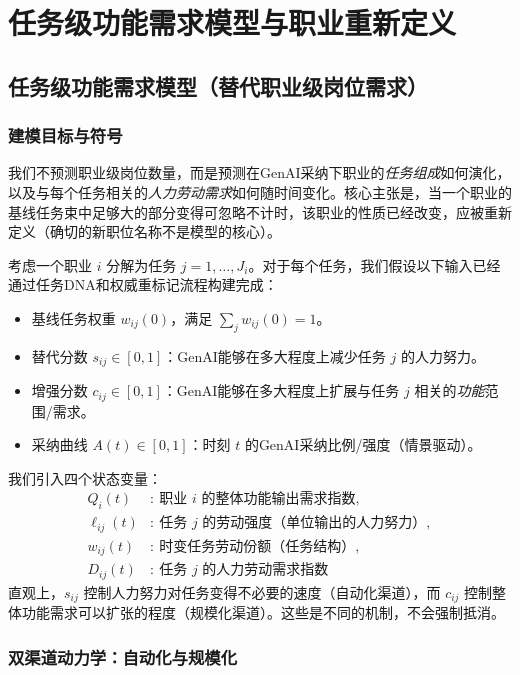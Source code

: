 \section{任务级功能需求模型与职业重新定义}
\label{sec:task_level_model}

\subsection{任务级功能需求模型（替代职业级岗位需求）}
\subsubsection{建模目标与符号}
\label{sec:notation}
我们不预测职业级岗位数量，而是预测在GenAI采纳下职业的\emph{任务组成}如何演化，以及与每个任务相关的\emph{人力劳动需求}如何随时间变化。核心主张是，当一个职业的基线任务束中足够大的部分变得可忽略不计时，该职业的性质已经改变，应被重新定义（确切的新职位名称不是模型的核心）。

考虑一个职业 $i$ 分解为任务 $j=1,\dots,J_i$。对于每个任务，我们假设以下输入已经通过任务DNA和权威重标记流程构建完成：
\begin{itemize}
  \item 基线任务权重 $w_{ij}(0)$，满足 $\sum_{j} w_{ij}(0)=1$。
  \item 替代分数 $s_{ij}\in[0,1]$：GenAI能够在多大程度上减少任务 $j$ 的人力努力。
  \item 增强分数 $c_{ij}\in[0,1]$：GenAI能够在多大程度上扩展与任务 $j$ 相关的\emph{功能}范围/需求。
  \item 采纳曲线 $A(t)\in[0,1]$：时刻 $t$ 的GenAI采纳比例/强度（情景驱动）。
\end{itemize}

我们引入四个状态变量：
\begin{align*}
Q_i(t) &:\ \text{职业 } i \text{ 的整体功能输出需求指数},\\
\ell_{ij}(t) &:\ \text{任务 } j \text{ 的劳动强度（单位输出的人力努力）},\\
w_{ij}(t) &:\ \text{时变任务劳动份额（任务结构）},\\
D_{ij}(t) &:\ \text{任务 } j \text{ 的人力劳动需求指数}
\end{align*}
直观上，$s_{ij}$ 控制人力努力对任务变得不必要的速度（自动化渠道），而 $c_{ij}$ 控制整体功能需求可以扩张的程度（规模化渠道）。这些是不同的机制，不会强制抵消。

\subsubsection{双渠道动力学：自动化与规模化}
\label{sec:two_channel}

